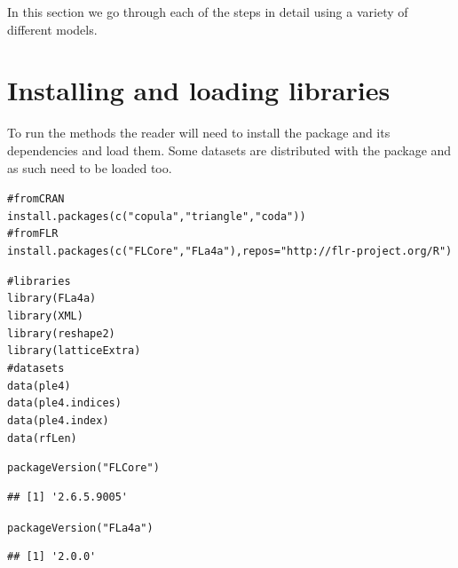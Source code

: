 \documentclass[a4paper,english,10pt]{article}\usepackage[]{graphicx}\usepackage[]{color}
\makeatletter
\newcommand{\hlstr}[1]{\textcolor[rgb]{0.063,0.58,0.627}{#1}}%
\newcommand{\hlcom}[1]{\textcolor[rgb]{0.588,0.588,0.588}{#1}}%
\newcommand{\hlstd}[1]{\textcolor[rgb]{0.196,0.196,0.196}{#1}}%
\newcommand{\hlkwc}[1]{\textcolor[rgb]{0,0.631,0.314}{#1}}%
\newcommand{\hlkwd}[1]{\textcolor[rgb]{0.78,0.227,0.412}{#1}}%
\newenvironment{kframe}{%
 \def\at@end@of@kframe{}%
 \ifinner\ifhmode%
  \def\at@end@of@kframe{\end{minipage}}%
  \begin{minipage}{\columnwidth}%
 \fi\fi%
 \def\FrameCommand##1{\hskip\@totalleftmargin \hskip-\fboxsep
 \colorbox{shadecolor}{##1}\hskip-\fboxsep
     \hskip-\linewidth \hskip-\@totalleftmargin \hskip\columnwidth}%
 \MakeFramed {\advance\hsize-\width
   \@totalleftmargin\z@ \linewidth\hsize
   \@setminipage}}%
 {\par\unskip\endMakeFramed%
 \at@end@of@kframe}
\newenvironment{knitrout}{}{} %
\makeatother
\begin{document}
In this section we go through each of the steps in detail using a variety of different models.




\section{Installing and loading libraries}

To run the  methods the reader will need to install the package and its dependencies and load them. Some datasets are distributed with the package and as such need to be loaded too.

\begin{knitrout}
\color{fgcolor}\begin{kframe}
\begin{alltt}
\hlcom{# from CRAN}
\hlkwd{install.packages}\hlstd{(}\hlkwd{c}\hlstd{(}\hlstr{"copula"}\hlstd{,} \hlstr{"triangle"}\hlstd{,} \hlstr{"coda"}\hlstd{))}
\hlcom{# from FLR}
\hlkwd{install.packages}\hlstd{(}\hlkwd{c}\hlstd{(}\hlstr{"FLCore"}\hlstd{,} \hlstr{"FLa4a"}\hlstd{),} \hlkwc{repos} \hlstd{=} \hlstr{"http://flr-project.org/R"}\hlstd{)}
\end{alltt}
\end{kframe}
\end{knitrout}

\begin{knitrout}
\color{fgcolor}\begin{kframe}
\begin{alltt}
\hlcom{# libraries}
\hlkwd{library}\hlstd{(FLa4a)}
\hlkwd{library}\hlstd{(XML)}
\hlkwd{library}\hlstd{(reshape2)}
\hlkwd{library}\hlstd{(latticeExtra)}
\hlcom{# datasets}
\hlkwd{data}\hlstd{(ple4)}
\hlkwd{data}\hlstd{(ple4.indices)}
\hlkwd{data}\hlstd{(ple4.index)}
\hlkwd{data}\hlstd{(rfLen)}
\end{alltt}
\end{kframe}
\end{knitrout}

\begin{knitrout}
\color{fgcolor}\begin{kframe}
\begin{alltt}
\hlkwd{packageVersion}\hlstd{(}\hlstr{"FLCore"}\hlstd{)}
\end{alltt}
\begin{verbatim}
## [1] '2.6.5.9005'
\end{verbatim}
\begin{alltt}
\hlkwd{packageVersion}\hlstd{(}\hlstr{"FLa4a"}\hlstd{)}
\end{alltt}
\begin{verbatim}
## [1] '2.0.0'
\end{verbatim}
\end{kframe}
\end{knitrout}
\end{document}
